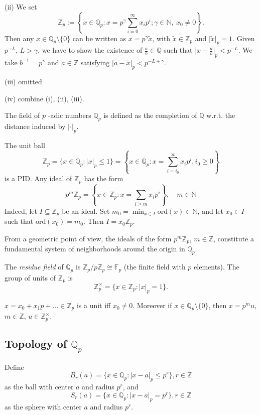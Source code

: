 (ii)
We set
\[
\mathbb{Z}_p:=\left\{x\in\mathbb{Q}_p:x=p^\gamma\sum_{i=0}^\infty x_ip^i;\gamma\in\mathbb{N},\:x_0\neq0\right\}.
\]
Then any $x\in \mathbb{Q}_{p}\setminus \{ 0 \}$ can be written as $x=p^{\gamma}\widetilde{x}$, with $\widetilde{x}\in \mathbb{Z}_{p}$ and $\lvert \widetilde{x} \rvert_{p}=1$. Given $p^{-L}$, $L>\gamma$, we have to show the existence of $\frac{a}{b}\in \mathbb{Q}$ such that $\left\lvert  x-\frac{a}{b}  \right\rvert_{p}<p^{-L}$. We take $b^{-1}=p^{\gamma}$ and $a\in \mathbb{Z}$ satisfying $\lvert a-\widetilde{x} \rvert_{p}<p^{-L+\gamma}$.

(iii) omitted

(iv) combine (i), (ii), (iii).

The field of $p$ -adic numbers $\mathbb{Q}_{p}$ is defined as the completion of $\mathbb{Q}$ w.r.t. the distance induced by $\lvert \cdot  \rvert_{p}$.

The unit ball
\[
\mathbb{Z}_{p}=\{ x\in \mathbb{Q}_{p}:\lvert x \rvert _{p}\leq 1 \}=\left\{  x\in \mathbb{Q}_{p} :x=\sum_{i=i_0}^{\infty} x_ip^{i},i_0\geq 0 \right\}
\]
is a PID. Any ideal of $\mathbb{Z}_{p}$ has the form
\[
p^{m}\mathbb{Z}_{p}=\left\{  x\in \mathbb{Z}_{p}:x=\sum_{i\geq m}^{} x_ip^{i}  \right\},\quad m\in \mathbb{N}
\]
Indeed, let $I\subseteq \mathbb{Z}_{p}$ be an ideal. Set $m_0=\min_{x\in I}\mathrm{ord}(x)\in \mathbb{N}$, and let $x_0\in I$ such that $\mathrm{ord}(x_0)=m_0$. Then $I=x_0\mathbb{Z}_{p}$.

From a geometric point of view, the ideals of the form $p^{m}\mathbb{Z}_{p}$, $m\in \mathbb{Z}$, constitute a fundamental system of neighborhoods around the origin in $\mathbb{Q}_{p}$.

The \textit{residue field} of $\mathbb{Q}_p$ is $\mathbb{Z}_p/p\mathbb{Z}_p \cong \mathbb{F}_p$ (the finite field with $p$ elements). The group of units of $\mathbb{Z}_p$ is
\[
\mathbb{Z}_p^{\times} = \{x \in \mathbb{Z}_p : |x|_p = 1\}.
\]

\begin{exercise}
$x=x_0+x_1p+\dots\in \mathbb{Z}_{p}$ is a unit iff $x_0\neq0$. Moreover if $x\in \mathbb{Q}_{p}\setminus \{ 0 \}$, then $x=p^{m}u$, $m\in \mathbb{Z}$, $u\in \mathbb{Z}_{p}^{\times}$.
\end{exercise}
\subsection{Topology of \texorpdfstring{$\mathbb{Q}_{p}$}{mathbbQ_p}}

Define
\[
B_{r}(a)=\{ x\in \mathbb{Q}_{p}:\lvert x-a \rvert _{p}\leq p^{r} \},r\in \mathbb{Z}
\]
as the ball with center $a$ and radius $p^{r}$, and
\[
S_{r}(a)=\{ x\in \mathbb{Q}_{p}:\lvert x-a \rvert _{p}=p^{r} \},r\in \mathbb{Z}
\]
as the sphere with center $a$ and radius $p^{r}$.

